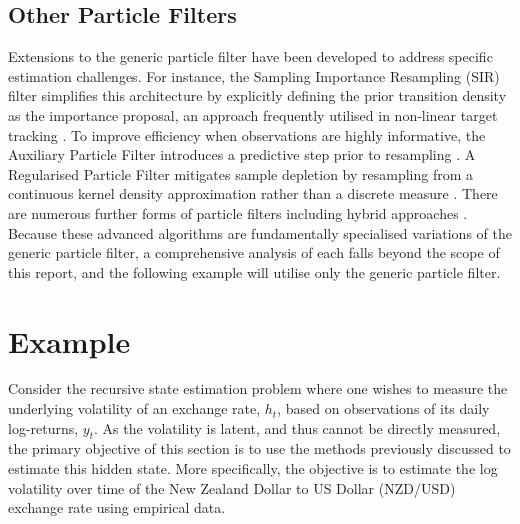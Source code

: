 \documentclass[10pt, a4paper]{article}
\numberwithin{equation}{section}
\begin{document}
\begin{algorithm}[ht]
\caption{Generic Particle Filter}\label{alg:gpf}
\begin{algorithmic}[1]
\ttfamily
{}
\EndFor{}
\EndFor{}
\EndIf{}
\end{algorithmic}
\end{algorithm}

\subsection{Other Particle Filters}
Extensions to the generic particle filter have been developed to address specific estimation challenges. For instance, the Sampling Importance Resampling (SIR) filter simplifies this architecture by explicitly defining the prior transition density as the importance proposal, an approach frequently utilised in non-linear target tracking \parencite{Arulampalam2002}. To improve efficiency when observations are highly informative, the Auxiliary Particle Filter introduces a predictive step prior to resampling \parencite{Pitt1999}. A Regularised Particle Filter mitigates sample depletion by resampling from a continuous kernel density approximation rather than a discrete measure \parencite{marti2011regularised}. There are numerous further forms of particle filters including hybrid approaches \parencite{Casarin2009, Elfring2021, Arulampalam2002}. Because these advanced algorithms are fundamentally specialised variations of the generic particle filter, a comprehensive analysis of each falls beyond the scope of this report, and the following example will utilise only the generic particle filter.

\section{Example}

Consider the recursive state estimation problem where one wishes to measure the underlying volatility of an exchange rate, $h_t$, based on observations of its daily log-returns, $y_t$. As the volatility is latent, and thus cannot be directly measured, the primary objective of this section is to use the methods previously discussed to estimate this hidden state. More specifically, the objective is to estimate the log volatility over time of the New Zealand Dollar to US Dollar (NZD/USD) exchange rate using empirical data.
\end{document}
